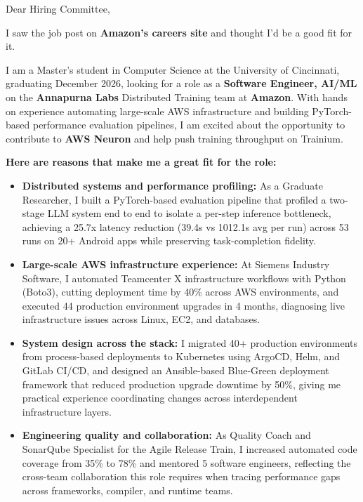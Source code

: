 \documentclass[11pt]{letter}
\date{}
\begin{document}
\begin{letter}{}

\opening{Dear Hiring Committee,}

I saw the job post on \textbf{Amazon's careers site} and thought I'd be a good fit for it.

I am a Master's student in Computer Science at the University of Cincinnati, graduating December 2026, looking for a role as a \textbf{Software Engineer, AI/ML} on the \textbf{Annapurna Labs} Distributed Training team at \textbf{Amazon}. With hands on experience automating large-scale AWS infrastructure and building PyTorch-based performance evaluation pipelines, I am excited about the opportunity to contribute to \textbf{AWS Neuron} and help push training throughput on Trainium.

\textbf{Here are reasons that make me a great fit for the role:}

\begin{itemize}[leftmargin=*, itemsep=0.45em]
    \item \textbf{Distributed systems and performance profiling:} As a Graduate Researcher, I built a PyTorch-based evaluation pipeline that profiled a two-stage LLM system end to end to isolate a per-step inference bottleneck, achieving a 25.7x latency reduction (39.4s vs 1012.1s avg per run) across 53 runs on 20+ Android apps while preserving task-completion fidelity.

    \item \textbf{Large-scale AWS infrastructure experience:} At Siemens Industry Software, I automated Teamcenter X infrastructure workflows with Python (Boto3), cutting deployment time by 40\% across AWS environments, and executed 44 production environment upgrades in 4 months, diagnosing live infrastructure issues across Linux, EC2, and databases.

    \item \textbf{System design across the stack:} I migrated 40+ production environments from process-based deployments to Kubernetes using ArgoCD, Helm, and GitLab CI/CD, and designed an Ansible-based Blue-Green deployment framework that reduced production upgrade downtime by 50\%, giving me practical experience coordinating changes across interdependent infrastructure layers.

    \item \textbf{Engineering quality and collaboration:} As Quality Coach and SonarQube Specialist for the Agile Release Train, I increased automated code coverage from 35\% to 78\% and mentored 5 software engineers, reflecting the cross-team collaboration this role requires when tracing performance gaps across frameworks, compiler, and runtime teams.
\end{itemize}


\end{letter}
\end{document}
